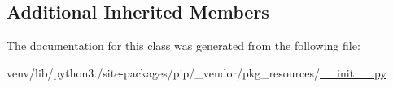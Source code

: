 \subsection*{Additional Inherited Members}


The documentation for this class was generated from the following file\+:\begin{DoxyCompactItemize}
\item 
venv/lib/python3./site-\/packages/pip/\+\_\+vendor/pkg\+\_\+resources/\hyperlink{venv_2lib_2python3_89_2site-packages_2pip_2__vendor_2pkg__resources_2____init_____8py}{\+\_\+\+\_\+init\+\_\+\+\_\+.\+py}\end{DoxyCompactItemize}
